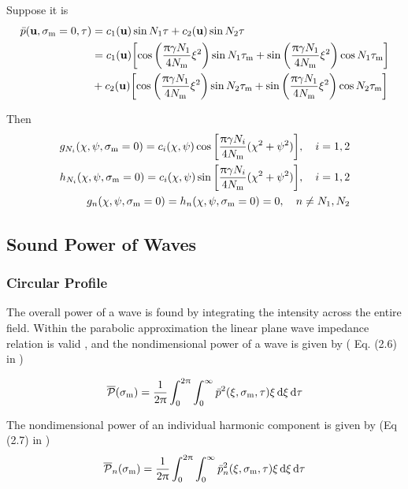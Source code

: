 \documentclass{article}
\begin{document}
Suppose it is 
\begin{align}
	\bar{p} (\vb{u},\sigma_\text{m} =0, \tau) &= c_1(\vb{u}) \sin N_1 \tau
	+c_2(\vb{u}) \sin N_2\tau \\
	& = c_1(\vb{u}) \qty[\cos\qty(\frac{\uppi \gamma N_1}{4N_\text{m}} \xi^2)\sin N_1 \tau_\text{m}
	+ \sin \qty(\frac{\uppi \gamma N_1}{4N_\text{m}}\xi^2)\cos N_1 \tau_\text{m}] \nonumber \\
	&+ c_2(\vb{u}) \qty[\cos\qty(\frac{\uppi \gamma N_1}{4N_\text{m}} \xi^2)\sin N_2\tau_\text{m}
	+ \sin \qty(\frac{\uppi \gamma N_1}{4 N_\text{m}}\xi^2)\cos N_2\tau_\text{m}]
\end{align}

Then
\begin{align}
	g_{N_i} (\chi, \psi, \sigma\st{m}=0) = c_i(\chi,\psi) \cos 
	\qty[\frac{\uppi \gamma N_i}{4 N\st{m}} (\chi^2 +\psi^2)]\qc i = 1,2\\
	h_{N_i} (\chi, \psi, \sigma\st{m}=0) = c_i(\chi,\psi) \sin 
	\qty[\frac{\uppi \gamma N_i}{4 N\st{m}} (\chi^2 +\psi^2)]\qc i=1,2\\
	g_n(\chi,\psi, \sigma\st{m}=0) = h_n(\chi,\psi,\sigma\st{m}=0) = 0\qc 
	n \neq N_1, N_2
\end{align}

\subsection{Sound Power of Waves}
\subsubsection{Circular Profile}
The overall power of a wave is found by integrating the intensity across 
the entire field.
Within the parabolic approximation the linear plane wave impedance relation
is valid \cite{tjotta1981}, and the nondimensional power of a wave is given by 
( Eq. (2.6) in \cite{vefring1989} )

$$
\overline{\mathcal{P}}(\sigma_\text{m})
=
\frac{1}{2\uppi} \int_0^{2\uppi} \int_0^\infty
\bar{p}^2 (\xi,\sigma_\text{m},\tau)\xi \dd{\xi} \dd{\tau}
$$

The nondimensional power of an individual harmonic component is given
by (Eq (2.7) in \cite{vefring1989})
\begin{align}
\overline{\mathcal{P}}_n(\sigma_\text{m})
=
\frac{1}{2\uppi} \int_0^{2\uppi} \int_0^\infty
\bar{p}_n^2 (\xi,\sigma_\text{m},\tau)\xi \dd{\xi} \dd{\tau}
\label{eq:power_n}
\end{align}
\end{document}
